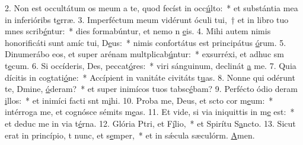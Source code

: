 2. Non est occultátum os meum a te, quod fecíst in occ\uline{ú}lto:~* et substántia mea in inferióribs t\uline{e}rræ.
3. Imperféctum meum vidérunt óculi tui,~† et in libro tuo mnes scrib\uline{é}ntur:~* dies formabúntur, et nemo n \uline{e}is.
4. Mihi autem nimis honorificáti sunt amíc tui, D\uline{e}us:~* nimis confortátus est principátus \uline{ó}rum.
5. Dinumerábo eos, et super arénam multplicab\uline{ú}ntur:~* exsurréxi, et adhuc sm t\uline{e}cum.
6. Si occíderis, Des, peccat\uline{ó}res:~* viri sánguinum, declinát \uline{a} me.
7. Quia dícitis in cogtati\uline{ó}ne:~* Accípient in vanitáte civitáts t\uline{u}as.
8. Nonne qui odérunt te, Dmine, \uline{ó}deram?~* et super inimícos tuos tabsc\uline{é}bam?
9. Perfécto ódio deram \uline{i}llos:~* et inimíci facti snt m\uline{i}hi.
10. Proba me, Deus, et scto cor m\uline{e}um:~* intérroga me, et cognósce sémits m\uline{e}as.
11. Et vide, si via iniquittis in m\uline{e} est:~* et deduc me in via t\uline{é}rna.
12. Glória Ptri, et F\uline{í}lio,~* et Spirítu S\uline{a}ncto.
13. Sicut erat in princípio, t nunc, et s\uline{e}mper,~* et in sǽcula sæculórm. \uline{A}men.
